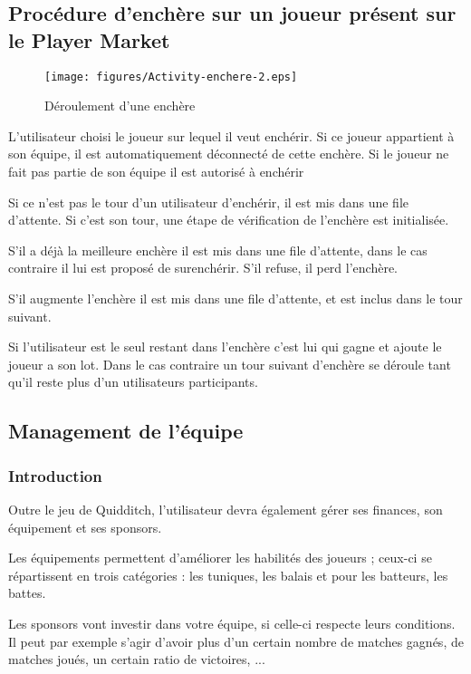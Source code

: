 \subsection{Procédure d'enchère sur un joueur présent sur le Player Market}
\label{fig:Enchere}
\begin{figure}[h!]
  \centering
  \texttt{[image: figures/Activity-enchere-2.eps]}
  \caption{\label{fig:Enchere} Déroulement d'une enchère}
\end{figure}
\begin{list}{}{\leftmargin=1.5em}
\item{L'utilisateur choisi le joueur sur lequel il veut enchérir. Si ce joueur appartient à son équipe, il est automatiquement déconnecté de cette enchère. Si le joueur ne fait pas partie de son équipe il est autorisé à enchérir}
\item{Si ce n'est pas  le tour d'un utilisateur d'enchérir, il est mis dans une file d'attente. Si c'est son tour, une étape de vérification de l'enchère est initialisée.}
\item{S'il a déjà la meilleure enchère il est mis dans une file d'attente, dans le cas contraire il lui est proposé de surenchérir. S'il refuse, il perd l'enchère.}
\item{S'il augmente l'enchère il est mis dans une file d'attente, et est inclus dans le tour suivant.}
\item{Si l'utilisateur est le seul restant dans l'enchère c'est lui qui gagne et ajoute le joueur a son lot. Dans le cas contraire un tour suivant d'enchère se déroule tant qu'il reste plus d'un utilisateurs participants.}
\end{list}
\subsection{Management de l'équipe}

\subsubsection{Introduction}
Outre le jeu de Quidditch, l'utilisateur devra également gérer ses finances, son équipement et ses sponsors.

Les équipements permettent d'améliorer les habilités des joueurs ; ceux-ci se répartissent en trois catégories : les tuniques, les balais et pour les batteurs, les battes.

Les sponsors vont investir dans votre équipe, si celle-ci respecte leurs conditions. Il peut par exemple s'agir d'avoir plus d'un certain nombre de matches gagnés, de matches joués, un certain ratio de victoires, ...

